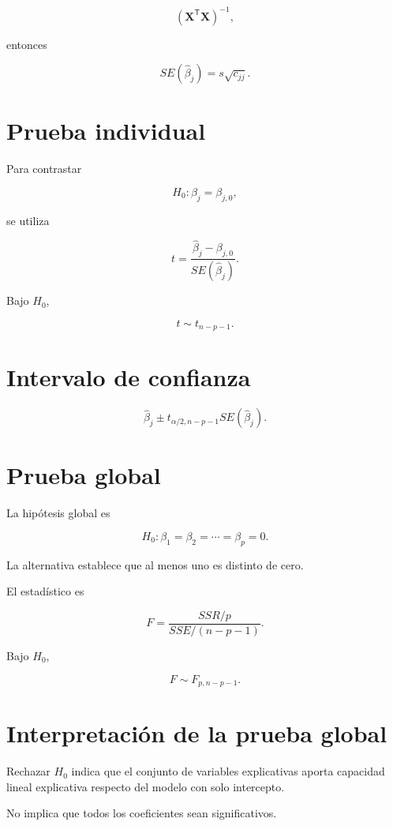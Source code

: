 \documentclass[
  spanish,
  11pt,
  letterpaper,
  DIV=11,
  numbers=noendperiod]{scrreprt}
\theoremstyle{definition}
\theoremstyle{plain}
\theoremstyle{definition}
\theoremstyle{remark}
\begin{document}
\[
\left(
\mathbf{X}^{\mathsf T}\mathbf{X}
\right)^{-1},
\]

entonces

\[
SE
(
\widehat{\beta}_j
)
=
s\sqrt{c_{jj}}.
\]

\section{Prueba individual}\label{prueba-individual}

Para contrastar

\[
H_0:\beta_j=\beta_{j,0},
\]

se utiliza

\[
t
=
\frac{
\widehat{\beta}_j-\beta_{j,0}
}{
SE(\widehat{\beta}_j)
}.
\]

Bajo \(H_0\),

\[
t
\sim
t_{n-p-1}.
\]

\section{Intervalo de confianza}\label{intervalo-de-confianza}

\[
\widehat{\beta}_j
\pm
t_{\alpha/2,n-p-1}
SE(\widehat{\beta}_j).
\]

\section{Prueba global}\label{prueba-global}

La hipótesis global es

\[
H_0:
\beta_1=\beta_2=\cdots=\beta_p=0.
\]

La alternativa establece que al menos uno es distinto de cero.

El estadístico es

\[
F
=
\frac{
SSR/p
}{
SSE/(n-p-1)
}.
\]

Bajo \(H_0\),

\[
F
\sim
F_{p,n-p-1}.
\]

\section{Interpretación de la prueba
global}\label{interpretaciuxf3n-de-la-prueba-global}

Rechazar \(H_0\) indica que el conjunto de variables explicativas aporta
capacidad lineal explicativa respecto del modelo con solo intercepto.

No implica que todos los coeficientes sean significativos.
\end{document}

